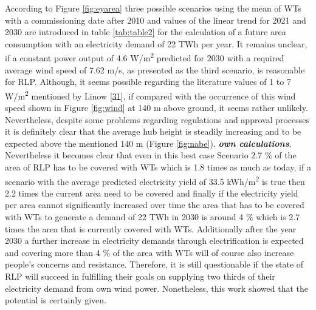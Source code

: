 \documentclass[a4paper,11pt]{article}
\begin{document}
According to Figure \ref{fig:eyarea} three possible scenarios using the mean of WTs with a commissioning date after 2010 and values of the linear trend for 2021 and 2030 are introduced in table \ref{tab:table2} for the calculation of a future area consumption with an electricity demand of 22 TWh per year. It remains unclear, if a constant power output of 4.6 W/m\textsuperscript{2} predicted for 2030 with a required average wind speed of 7.62 m/s, as presented as the third scenario, is reasonable for RLP. Although, it seems possible regarding the literature values of 1 to 7 W/m\textsuperscript{2} mentioned by Linow {[}\protect\hyperlink{ref-SvenLinow.2020}{31}{]}, if compared with the occurrence of this wind speed shown in Figure \ref{fig:wind} at 140 m above ground, it seems rather unlikely. Nevertheless, despite some problems regarding regulations and approval processes it is definitely clear that the average hub height is steadily increasing and to be expected above the mentioned 140 m (Figure \ref{fig:nabe}). \textbf{\emph{own calculations}}. Nevertheless it becomes clear that even in this best case Scenario 2.7 \% of the area of RLP has to be covered with WTs which is 1.8 times as much as today, if a scenario with the average predicted electricity yield of 33.5 kWh/m\textsuperscript{2} is true then 2.2 times the current area need to be covered and finally if the electricity yield per area cannot significantly increased over time the area that has to be covered with WTs to generate a demand of 22 TWh in 2030 is around 4 \% which is 2.7 times the area that is currently covered with WTs. Additionally after the year 2030 a further increase in electricity demands through electrification is expected and covering more than 4 \% of the area with WTs will of course also increase people's concerns and resistance. Therefore, it is still questionable if the state of RLP will succeed in fulfilling their goals on supplying two thirds of their electricity demand from own wind power. Nonetheless, this work showed that the potential is certainly given.
\end{document}
